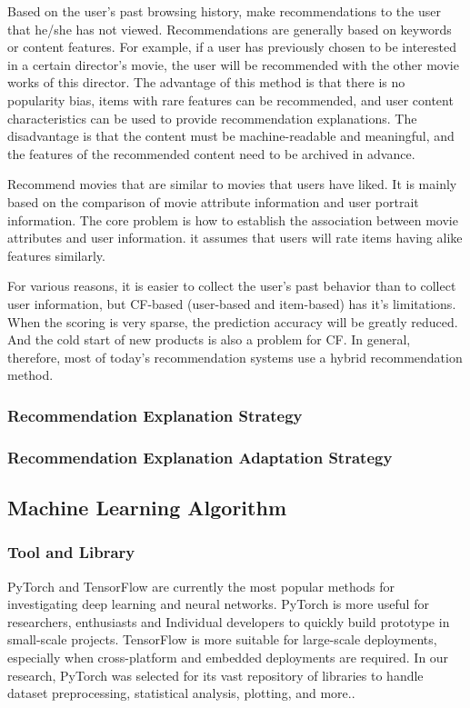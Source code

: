 \begin{itemize}
Based on the user's past browsing history, make recommendations to the user that he/she has not viewed. Recommendations are generally based on keywords or content features. For example, if a user has previously chosen to be interested in a certain director's movie, the user will be recommended with the other movie works of this director. The advantage of this method is that there is no popularity bias, items with rare features can be recommended, and user content characteristics can be used to provide recommendation explanations. The disadvantage is that the content must be machine-readable and meaningful, and the features of the recommended content need to be archived in advance.
\par Recommend movies that are similar to movies that users have liked. It is mainly based on the comparison of movie attribute information and user portrait information. The core problem is how to establish the association between movie attributes and user information. it assumes that users will rate items having alike features similarly\cite{safoury2013exploiting}.

\end{itemize}

\par For various reasons, it is easier to collect the user's past behavior than to collect user information, but CF-based (user-based and item-based) has it's limitations. When the scoring is very sparse, the prediction accuracy will be greatly reduced. And the cold start of new products is also a problem for CF. In general, therefore, most of today's recommendation systems use a hybrid recommendation method.
\subsubsection{Recommendation Explanation Strategy}
\subsubsection{Recommendation Explanation Adaptation Strategy}

\subsection{Machine Learning Algorithm}

\subsubsection{Tool and Library}
PyTorch\cite{ketkar2017introduction} and TensorFlow\cite{abadi2016tensorflow} are currently the most popular methods for investigating deep learning and neural networks. PyTorch is more useful for researchers, enthusiasts and Individual developers to quickly build prototype in small-scale projects. TensorFlow is more suitable for large-scale deployments, especially when cross-platform and embedded deployments are required. In our research, PyTorch was selected for its vast repository of libraries to handle dataset preprocessing, statistical analysis, plotting, and more.\cite{paszke2019pytorch}.

